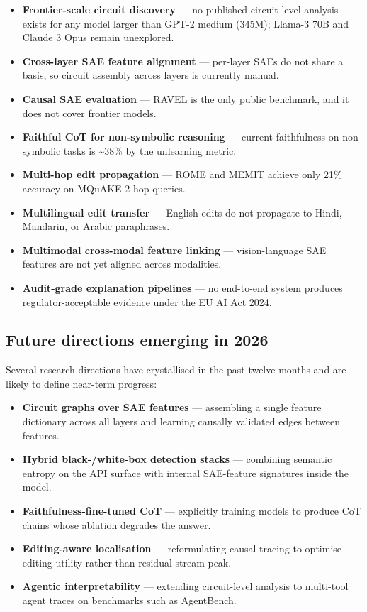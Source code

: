 \begin{itemize}
\tightlist
\item
  \textbf{Frontier-scale circuit discovery} --- no published circuit-level analysis exists for any model larger than GPT-2 medium (345M); Llama-3 70B and Claude 3 Opus remain unexplored.
\item
  \textbf{Cross-layer SAE feature alignment} --- per-layer SAEs do not share a basis, so circuit assembly across layers is currently manual.
\item
  \textbf{Causal SAE evaluation} --- RAVEL is the only public benchmark, and it does not cover frontier models.
\item
  \textbf{Faithful CoT for non-symbolic reasoning} --- current faithfulness on non-symbolic tasks is \textasciitilde38\% by the unlearning metric.
\item
  \textbf{Multi-hop edit propagation} --- ROME and MEMIT achieve only 21\% accuracy on MQuAKE 2-hop queries.
\item
  \textbf{Multilingual edit transfer} --- English edits do not propagate to Hindi, Mandarin, or Arabic paraphrases.
\item
  \textbf{Multimodal cross-modal feature linking} --- vision-language SAE features are not yet aligned across modalities.
\item
  \textbf{Audit-grade explanation pipelines} --- no end-to-end system produces regulator-acceptable evidence under the EU AI Act 2024.
\end{itemize}

\subsection{Future directions emerging in 2026}\label{future-directions-emerging-in-2026}

Several research directions have crystallised in the past twelve months and are likely to define near-term progress:

\begin{itemize}
\tightlist
\item
  \textbf{Circuit graphs over SAE features} --- assembling a single feature dictionary across all layers and learning causally validated edges between features.
\item
  \textbf{Hybrid black-/white-box detection stacks} --- combining semantic entropy on the API surface with internal SAE-feature signatures inside the model.
\item
  \textbf{Faithfulness-fine-tuned CoT} --- explicitly training models to produce CoT chains whose ablation degrades the answer.
\item
  \textbf{Editing-aware localisation} --- reformulating causal tracing to optimise editing utility rather than residual-stream peak.
\item
  \textbf{Agentic interpretability} --- extending circuit-level analysis to multi-tool agent traces on benchmarks such as AgentBench.
\end{itemize}

